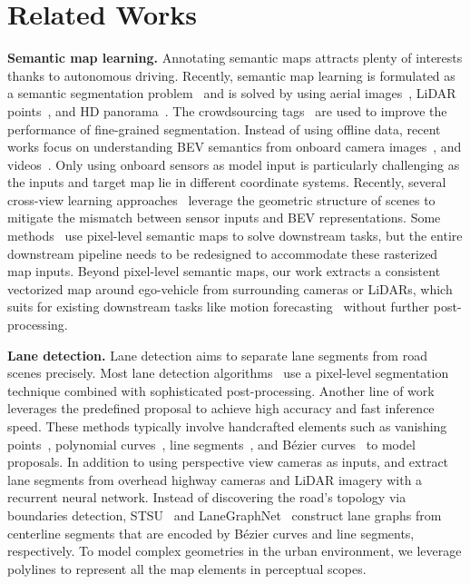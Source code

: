 \documentclass{article}
\theoremstyle{plain}
\theoremstyle{definition}
\theoremstyle{remark}
\begin{document}
\section{Related Works}
\noindent\textbf{Semantic map learning.}
Annotating semantic maps attracts plenty of interests thanks to autonomous driving.  Recently, semantic map learning is formulated as a semantic segmentation problem~\citep{mattyus2015enhancing} and is solved by using aerial images~\citep{mattyus2016hd}, LiDAR points~\citep{yang2018hdnet}, and HD panorama~\citep{wang2016torontocity}. The crowdsourcing tags~\citep{wang2015holistic} are used to improve the performance of fine-grained segmentation.
Instead of using offline data, recent works focus on understanding BEV semantics from onboard camera images~\citep{lu2019monocular,yang2021projecting}, and videos~\citep{can2020understanding}.
Only using onboard sensors as model input is particularly challenging as the inputs and target map lie in different coordinate systems. Recently, several cross-view learning approaches~\citep{philion2020lift,pan2020cross,li2021hdmapnet,zhou2022cross,wang2022detr3d,chen2022futr3d} leverage the geometric structure of scenes to mitigate the mismatch between sensor inputs and BEV representations. 
Some methods~\citep{casas2021mp3, sadat2020perceive} use pixel-level semantic maps to solve downstream tasks, but the entire downstream pipeline needs to be redesigned to accommodate these rasterized map inputs.
Beyond pixel-level semantic maps, our work extracts a consistent vectorized map around ego-vehicle from surrounding cameras or LiDARs, which suits for existing downstream tasks like motion forecasting~\citep{vectornet,tnt,liu2021multimodal} without further post-processing.

\noindent\textbf{Lane detection.}
Lane detection aims to separate lane segments from road scenes precisely. Most lane detection algorithms~\citep{pan2018spatial,neven2018towards} use a pixel-level segmentation technique combined with sophisticated post-processing. Another line of work leverages the predefined proposal to achieve high accuracy and fast inference speed. These methods typically involve handcrafted elements such as vanishing points~\citep{lee2017vpgnet}, polynomial curves~\citep{van2019end}, line segments~\citep{li2019line}, and B\'ezier curves~\citep{feng2022rethinking} to model proposals. In addition to using perspective view cameras as inputs, \citep{homayounfar2018hierarchical} and \citep{liang2019convolutional} extract lane segments from overhead highway cameras and LiDAR imagery with a recurrent neural network.
Instead of discovering the road's topology via boundaries detection, STSU~\citep{can2021structured} and LaneGraphNet~\citep{zurn2021lane} construct lane graphs from centerline segments that are encoded by B\'ezier curves and line segments, respectively.
To model complex geometries in the urban environment, we leverage polylines to represent all the map elements in perceptual scopes. 
\end{document}
